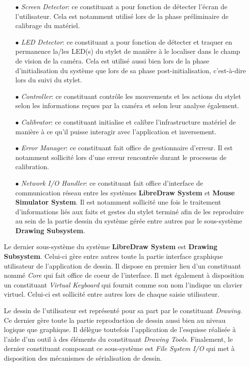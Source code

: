 \documentclass[11pt,a4paper,oldfontcommands]{memoir}
\begin{document}
\begin{itemize}
\item[$\bullet$] \textit{Screen Detector}: ce constituant a pour fonction de détecter l'écran de l'utilisateur. Cela est notamment utilisé lors de la phase préliminaire de calibrage du matériel.
\item[$\bullet$] \textit{LED Detector}: ce constituant a pour fonction de détecter et traquer en permanence la/les LED(s) du stylet de manière à le localiser dans le champ de vision de la caméra. Cela est utilisé aussi bien lors de la phase d'initialisation du système que lors de sa phase post-initialisation, c'est-à-dire lors du suivi du stylet.
\item[$\bullet$] \textit{Controller}: ce constituant contrôle les mouvements et les actions du stylet selon les informations reçues par la caméra et selon leur analyse également.
\item[$\bullet$] \textit{Calibrator}: ce constituant initialise et calibre l'infrastructure matériel de manière à ce qu'il puisse interagir avec l'application et inversement.
\item[$\bullet$] \textit{Error Manager}: ce constituant fait office de gestionnaire d'erreur. Il est notamment sollicité lors d'une erreur rencontrée durant le processus de calibration.
\item[$\bullet$] \textit{Network I/O Handler}: ce constituant fait office d'interface de communication réseau entre les systèmes \textbf{LibreDraw System} et \textbf{Mouse Simulator System}. Il est notamment sollicité une fois le traitement d'informations liés aux faits et gestes du stylet terminé afin de les reproduire au sein de la partie dessin du système gérée entre autres par le sous-système \textbf{Drawing Subsystem}.
\end{itemize}

Le dernier sous-système du système \textbf{LibreDraw System} est \textbf{Drawing Subsystem}. Celui-ci gère entre autres toute la partie interface graphique utilisateur de l'application de dessin. Il dispose en premier lieu d'un constituant nommé \textit{Core} qui fait office de coeur de l'interface. Il met également à disposition un constituant \textit{Virtual Keyboard} qui fournit comme son nom l'indique un clavier virtuel. Celui-ci est sollicité entre autres lors de chaque saisie utilisateur. 

Le dessin de l'utilisateur est représenté pour sa part par le constituant \textit{Drawing}. Ce dernier gère toute la partie reproduction de dessin aussi bien au niveau logique que graphique. Il délègue toutefois l'application de l'esquisse réalisée à l'aide d'un outil à des éléments du constituant \textit{Drawing Tools}. Finalement, le dernier constituant composant ce sous-système est \textit{File System I/O} qui met à disposition des mécanismes de sérialisation de dessin.
\end{document}
